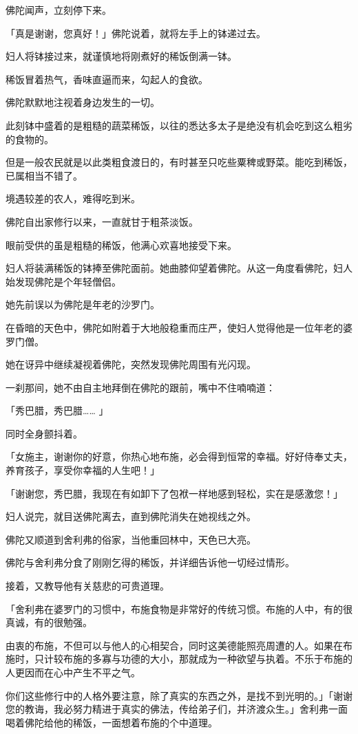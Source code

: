 \documentclass[twoside,openany]{book}
\begin{document}
佛陀闻声，立刻停下来。

「真是谢谢，您真好！」佛陀说着，就将左手上的钵递过去。

妇人将钵接过来，就谨慎地将刚煮好的稀饭倒满一钵。

稀饭冒着热气，香味直逼而来，勾起人的食欲。

佛陀默默地注视着身边发生的一切。

此刻钵中盛着的是粗糙的蔬菜稀饭，以往的悉达多太子是绝没有机会吃到这么粗劣的食物的。

但是一般农民就是以此类粗食渡日的，有时甚至只吃些粟稗或野菜。能吃到稀饭，已属相当不错了。

境遇较差的农人，难得吃到米。

佛陀自出家修行以来，一直就甘于粗茶淡饭。

眼前受供的虽是粗糙的稀饭，他满心欢喜地接受下来。

妇人将装满稀饭的钵捧至佛陀面前。她曲膝仰望着佛陀。从这一角度看佛陀，妇人始发现佛陀是个年轻僧侣。

她先前误以为佛陀是年老的沙罗门。

在昏暗的天色中，佛陀如附着于大地般稳重而庄严，使妇人觉得他是一位年老的婆罗门僧。

她在讶异中继续凝视着佛陀，突然发现佛陀周围有光闪现。

一刹那间，她不由自主地拜倒在佛陀的跟前，嘴中不住喃喃道：

「秀巴腊，秀巴腊……	」

同时全身颤抖着。

「女施主，谢谢你的好意，你热心地布施，必会得到恒常的幸福。好好侍奉丈夫，养育孩子，享受你幸福的人生吧！」

「谢谢您，秀巴腊，我现在有如卸下了包袱一样地感到轻松，实在是感激您！」

妇人说完，就目送佛陀离去，直到佛陀消失在她视线之外。

佛陀又顺道到舍利弗的俗家，当他重回林中，天色已大亮。

佛陀与舍利弗分食了刚刚乞得的稀饭，并详细告诉他一切经过情形。

接着，又教导他有关慈悲的可贵道理。

「舍利弗在婆罗门的习惯中，布施食物是非常好的传统习惯。布施的人中，有的很真诚，有的很勉强。

由衷的布施，不但可以与他人的心相契合，同时这美德能照亮周遭的人。如果在布施时，只计较布施的多寡与功德的大小，那就成为一种欲望与执着。不乐于布施的人更因而在心中产生不平之气。

你们这些修行中的人格外要注意，除了真实的东西之外，是找不到光明的。」「谢谢您的教诲，我必努力精进于真实的佛法，传给弟子们，并济渡众生。」舍利弗一面喝着佛陀给他的稀饭，一面想着布施的个中道理。
\end{document}
